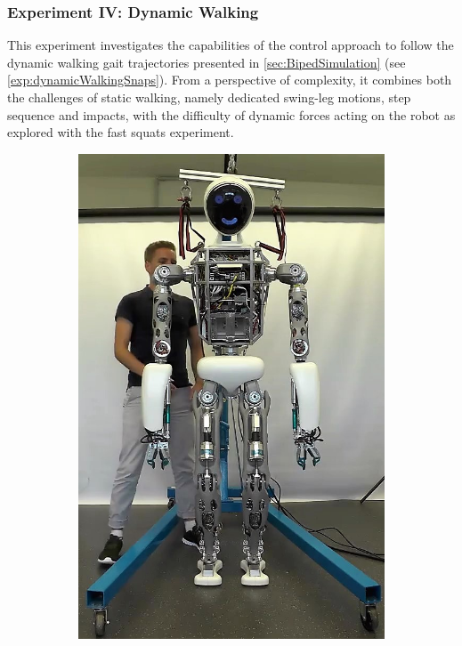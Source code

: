 \subsubsection{Experiment IV: Dynamic Walking}
This experiment investigates the capabilities of the control approach to follow the dynamic walking gait trajectories presented in \cref{sec:BipedSimulation} (see \cref{exp:dynamicWalkingSnaps}). From a perspective of complexity, it combines both the challenges of static walking, namely dedicated swing-leg motions, step sequence and impacts, with the difficulty of dynamic forces acting on the robot as explored with the fast squats experiment.
\begin{figure}[h!]
\begin{subfigure}{.2\textwidth}
	\includegraphics[width=.95\linewidth]{experiments/walkDynamic/snaps/1}

\end{subfigure}
\end{figure}
